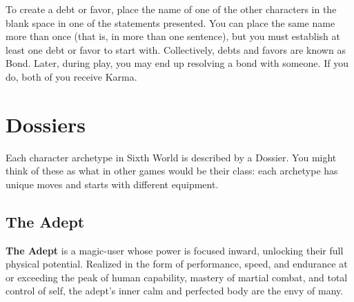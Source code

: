 To create a debt or favor, place the name of one of the other characters in the blank space in one of the statements presented. You can place the same name more than once (that is, in more than one sentence), but you must establish at least one debt or favor to start with. Collectively, debts and favors are known as Bond. Later, during play, you may end up resolving a bond with someone. If you do, both of you receive Karma.



\section{Dossiers} \label{Dossiers}

Each character archetype in Sixth World is described by a Dossier. You might think of these as what in other games would be their class: each archetype has unique moves and starts with different equipment. 


\clearpage
\subsection{The Adept}
\textbf{The Adept} is a magic-user whose power is focused inward, unlocking their full physical potential. Realized in the form of performance, speed, and endurance at or exceeding the peak of human capability, mastery of martial combat, and total control of self, the adept’s inner calm and perfected body are the envy of many.

